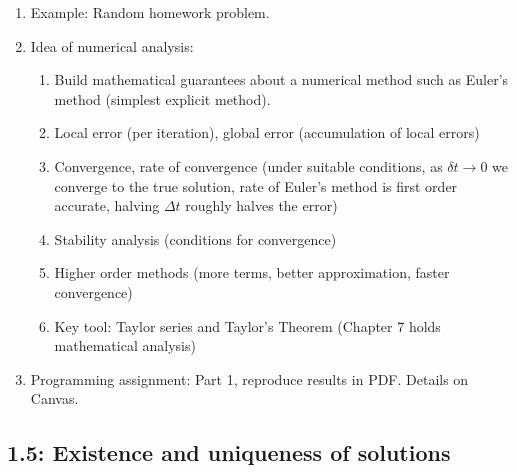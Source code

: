 \documentclass{article}
\begin{document}
\begin{enumerate}
\item Example: Random homework problem.

\item Idea of numerical analysis:
\begin{enumerate}
\item Build mathematical guarantees about a numerical method such as Euler's method (simplest explicit method).
\item Local error (per iteration), global error (accumulation of local errors)
\item Convergence, rate of convergence (under suitable conditions, as $\delta t \rightarrow 0$ we converge to the true solution, rate of Euler's method is first order accurate, halving $\Delta t$ roughly halves the error)
\item Stability analysis (conditions for convergence)
\item Higher order methods (more terms, better approximation, faster convergence)
\item Key tool: Taylor series and Taylor's Theorem (Chapter 7 holds mathematical analysis)
\end{enumerate}

\item Programming assignment: Part 1, reproduce results in PDF. Details on Canvas.

\end{enumerate}



\subsection{1.5: Existence and uniqueness of solutions}
\end{document}
